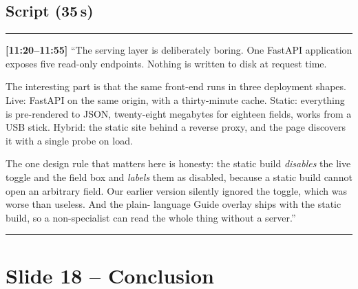 \documentclass[11pt,a4paper]{article}
\begin{document}
\subsection*{Script (35\,s)}
\noindent\rule{\linewidth}{0.3pt}\par\smallskip\noindent
\textbf{[11:20--11:55]} ``The serving layer is deliberately boring. One FastAPI application exposes five
read-only endpoints. Nothing is written to disk at request time.

The interesting part is that the same front-end runs in three deployment shapes. Live: FastAPI on the
same origin, with a thirty-minute cache. Static: everything is pre-rendered to JSON, twenty-eight
megabytes for eighteen fields, works from a USB stick. Hybrid: the static site behind a reverse proxy,
and the page discovers it with a single probe on load.

The one design rule that matters here is honesty: the static build \emph{disables} the live toggle and
the field box and \emph{labels} them as disabled, because a static build cannot open an arbitrary
field. Our earlier version silently ignored the toggle, which was worse than useless. And the plain-
language Guide overlay ships with the static build, so a non-specialist can read the whole thing
without a server.''
\par\smallskip\noindent\rule{\linewidth}{0.3pt}

\section{Slide 18 -- Conclusion}
\end{document}
